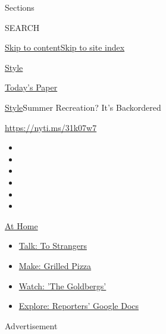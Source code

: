 Sections

SEARCH

\protect\hyperlink{site-content}{Skip to
content}\protect\hyperlink{site-index}{Skip to site index}

\href{https://www.nytimes.com/section/style}{Style}

\href{https://myaccount.nytimes.com/auth/login?response_type=cookie\&client_id=vi}{}

\href{https://www.nytimes.com/section/todayspaper}{Today's Paper}

\href{/section/style}{Style}\textbar{}Summer Recreation? It's
Backordered

\url{https://nyti.ms/31k07w7}

\begin{itemize}
\item
\item
\item
\item
\item
\item
\end{itemize}

\href{https://www.nytimes.com/spotlight/at-home?action=click\&pgtype=Article\&state=default\&region=TOP_BANNER\&context=at_home_menu}{At
Home}

\begin{itemize}
\tightlist
\item
  \href{https://www.nytimes.com/2020/08/03/well/family/the-benefits-of-talking-to-strangers.html?action=click\&pgtype=Article\&state=default\&region=TOP_BANNER\&context=at_home_menu}{Talk:
  To Strangers}
\item
  \href{https://www.nytimes.com/2020/08/01/at-home/coronavirus-make-pizza-on-a-grill.html?action=click\&pgtype=Article\&state=default\&region=TOP_BANNER\&context=at_home_menu}{Make:
  Grilled Pizza}
\item
  \href{https://www.nytimes.com/2020/07/31/arts/television/goldbergs-abc-stream.html?action=click\&pgtype=Article\&state=default\&region=TOP_BANNER\&context=at_home_menu}{Watch:
  'The Goldbergs'}
\item
  \href{https://www.nytimes.com/interactive/2020/at-home/even-more-reporters-editors-diaries-lists-recommendations.html?action=click\&pgtype=Article\&state=default\&region=TOP_BANNER\&context=at_home_menu}{Explore:
  Reporters' Google Docs}
\end{itemize}

Advertisement

